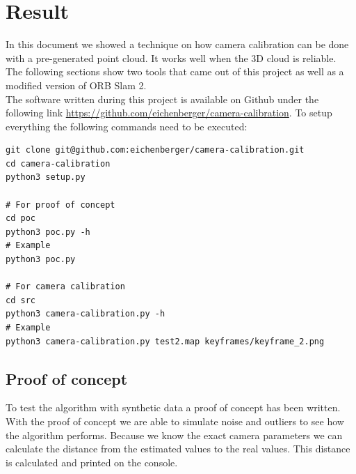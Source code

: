 \documentclass[11pt,a4paper,titlepage,oneside]{report}
\begin{document}
\chapter{Result}

In this document we showed a technique on how camera calibration can be done with a pre-generated point cloud. It works well when the 3D cloud is reliable. The following sections show two tools that came out of this project as well as a modified version of ORB Slam 2.\\

The software written during this project is available on Github under the following link \url{https://github.com/eichenberger/camera-calibration}. To setup everything the following commands need to be executed:
\small
\lstset{language=bash}
\begin{lstlisting}
git clone git@github.com:eichenberger/camera-calibration.git
cd camera-calibration
python3 setup.py

# For proof of concept
cd poc
python3 poc.py -h
# Example
python3 poc.py

# For camera calibration
cd src
python3 camera-calibration.py -h
# Example
python3 camera-calibration.py test2.map keyframes/keyframe_2.png
\end{lstlisting}
\normalsize


\section{Proof of concept}

To test the algorithm with synthetic data a proof of concept has been written. With the proof of concept we are able to simulate noise and outliers to see how the algorithm performs. Because we know the exact camera parameters we can calculate the distance from the estimated values to the real values. This distance is calculated and printed on the console.\\
\end{document}

